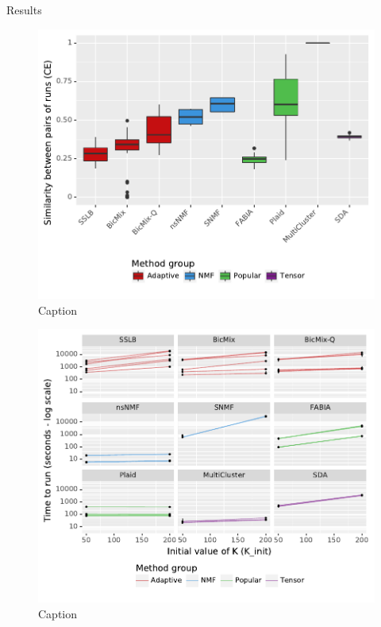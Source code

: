 \documentclass[final]{beamer}
\newlength{\onecolwid}
\begin{document}
\begin{frame}[t]
\begin{columns}[t]
\begin{column}{\onecolwid}
\begin{block}{Results}
\begin{figure}
\includegraphics[width=0.9 \textwidth]{plots/similarity_methods_K.pdf}
\caption{Caption}
\end{figure}

\begin{figure}
\includegraphics[width=0.9 \textwidth]{plots/IMPC_comp_reqs_s_against_K.pdf}
\caption{Caption}
\end{figure}


\end{block}
\end{column}
\end{columns}
\end{frame}
\end{document}
